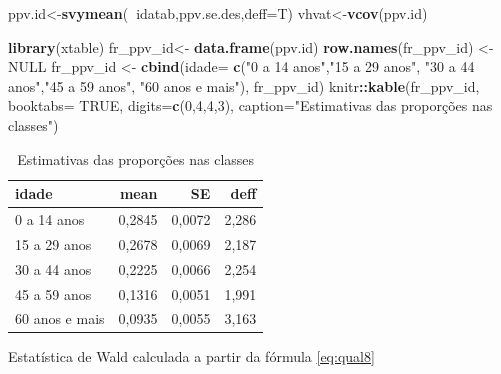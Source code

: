 \documentclass[]{book}
\newenvironment{Shaded}{\begin{snugshade}}{\end{snugshade}}
\newcommand{\KeywordTok}[1]{\textcolor[rgb]{0.13,0.29,0.53}{\textbf{#1}}}
\newcommand{\DataTypeTok}[1]{\textcolor[rgb]{0.13,0.29,0.53}{#1}}
\newcommand{\DecValTok}[1]{\textcolor[rgb]{0.00,0.00,0.81}{#1}}
\newcommand{\StringTok}[1]{\textcolor[rgb]{0.31,0.60,0.02}{#1}}
\newcommand{\OtherTok}[1]{\textcolor[rgb]{0.56,0.35,0.01}{#1}}
\newcommand{\OperatorTok}[1]{\textcolor[rgb]{0.81,0.36,0.00}{\textbf{#1}}}
\newcommand{\NormalTok}[1]{#1}
\theoremstyle{definition}
\theoremstyle{definition}
\theoremstyle{definition}
\theoremstyle{remark}
\begin{document}
\begin{Shaded}
\begin{Highlighting}[]
\NormalTok{ppv.id<-}\KeywordTok{svymean}\NormalTok{(}\OperatorTok{~}\NormalTok{idatab,ppv.se.des,}\DataTypeTok{deff=}\NormalTok{T)}
\NormalTok{vhvat<-}\KeywordTok{vcov}\NormalTok{(ppv.id)}
\end{Highlighting}
\end{Shaded}

\begin{Shaded}
\begin{Highlighting}[]
\KeywordTok{library}\NormalTok{(xtable)}
\NormalTok{fr_ppv_id<-}\StringTok{ }\KeywordTok{data.frame}\NormalTok{(ppv.id)}
\KeywordTok{row.names}\NormalTok{(fr_ppv_id) <-}\StringTok{ }\OtherTok{NULL}
\NormalTok{fr_ppv_id <-}\StringTok{ }\KeywordTok{cbind}\NormalTok{(}\DataTypeTok{idade=} \KeywordTok{c}\NormalTok{(}\StringTok{"0 a 14 anos"}\NormalTok{,}\StringTok{"15 a 29 anos"}\NormalTok{, }\StringTok{"30 a 44 anos"}\NormalTok{,}\StringTok{"45 a 59 anos"}\NormalTok{, }\StringTok{"60 anos e mais"}\NormalTok{), fr_ppv_id)}
\NormalTok{knitr}\OperatorTok{::}\KeywordTok{kable}\NormalTok{(fr_ppv_id, }\DataTypeTok{booktabs=} \OtherTok{TRUE}\NormalTok{, }\DataTypeTok{digits=}\KeywordTok{c}\NormalTok{(}\DecValTok{0}\NormalTok{,}\DecValTok{4}\NormalTok{,}\DecValTok{4}\NormalTok{,}\DecValTok{3}\NormalTok{), }\DataTypeTok{caption=}\StringTok{"Estimativas das proporções nas classes"}\NormalTok{) }
\end{Highlighting}
\end{Shaded}

\begin{table}

\caption{\label{tab:estpropclas}Estimativas das proporções nas classes}
\centering
\begin{tabular}[t]{lrrr}
\toprule
idade & mean & SE & deff\\
\midrule
0 a 14 anos & 0,2845 & 0,0072 & 2,286\\
15 a 29 anos & 0,2678 & 0,0069 & 2,187\\
30 a 44 anos & 0,2225 & 0,0066 & 2,254\\
45 a 59 anos & 0,1316 & 0,0051 & 1,991\\
60 anos e mais & 0,0935 & 0,0055 & 3,163\\
\bottomrule
\end{tabular}
\end{table}

Estatística de Wald calculada a partir da fórmula \eqref{eq:qual8}
\end{document}
